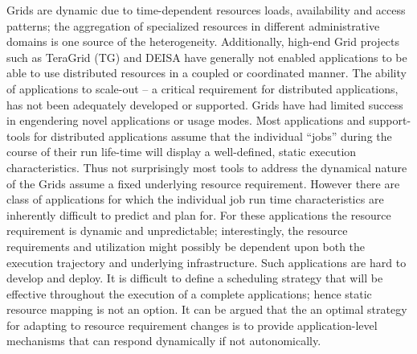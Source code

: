 \documentclass{sig-alternate}
\newcommand{\jhanote}[1]{ {\textcolor{red} { ***Jha: #1 }}}
\newcommand{\yyenote}[1]{ {\textcolor{blue} { ***yye00: #1 }}}
\newcommand{\jhanote}[1]{}
\newcommand{\yyenote}[1]{}
\begin{document}

Grids are dynamic due to time-dependent resources loads, availability
and access patterns; the aggregation of specialized resources in
different administrative domains is one source of the heterogeneity.
Additionally, high-end Grid projects such as TeraGrid (TG) and DEISA have
generally not enabled applications to be able to use distributed
resources in a coupled or coordinated manner. The ability of
applications to scale-out -- a critical requirement for distributed
applications, has not been adequately developed or supported. Grids
have had limited success in engendering novel applications or usage
modes.  Most applications and support-tools for distributed
applications assume that the individual ``jobs'' during the course of
their run life-time will display a well-defined, static execution
characteristics.  Thus not surprisingly most tools to address the
dynamical nature of the Grids assume a fixed underlying resource
requirement.  However there are class of applications for which the
individual job run time characteristics are inherently difficult to
predict and plan for. For these applications the resource requirement
is dynamic and unpredictable; interestingly, the resource requirements
and utilization might possibly be dependent upon both the execution
trajectory and underlying infrastructure. Such applications are hard
to develop and deploy. It is difficult to define a scheduling strategy
that will be effective throughout the execution of a complete
applications; hence static resource mapping is not an option.  It can
be argued that the an optimal strategy for adapting to resource
requirement changes is to provide application-level mechanisms that
can respond dynamically if not autonomically.

\end{document}
